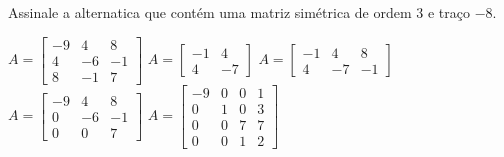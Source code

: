 Assinale a alternatica que contém uma matriz simétrica de ordem $3$ e traço $-8$.

$A = \left[ \begin{array}{ccc}-9 & 4 & 8 \\4 & -6 & -1 \\8 & -1 & 7\end{array} \right]$
$A = \left[ \begin{array}{cc} -1 & 4 \\ 4 & -7 \end{array} \right]$
$A = \left[ \begin{array}{ccc} -1 & 4 & 8 \\ 4 & -7 & -1 \end{array} \right]$
$A = \left[ \begin{array}{ccc} -9 & 4 & 8 \\ 0 & -6 & -1 \\ 0 & 0 & 7 \end{array} \right]$
$A = \left[ \begin{array}{cccc} -9 & 0 & 0 & 1 \\ 0 & 1 & 0 & 3 \\ 0 & 0 & 7 & 7 \\ 0 & 0 & 1& 2 \end{array} \right]$


